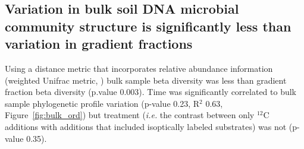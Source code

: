 \subsection{Variation in bulk soil DNA microbial community structure is significantly less
than variation in gradient fractions} 
Using a distance metric that incorporates relative abundance information
(weighted Unifrac metric, \citep{Lozupone_2005}) bulk sample beta diversity was
less than gradient fraction beta diversity (p.value 0.003). Time was
significantly correlated to bulk sample phylogenetic profile variation (p-value
0.23, R$^{2}$ 0.63, Figure~\ref{fig:bulk_ord}) but treatment (\textit{i.e.} the contrast
between only $^{12}$C additions with additions that included isoptically
labeled substrates) was not (p-value 0.35).

